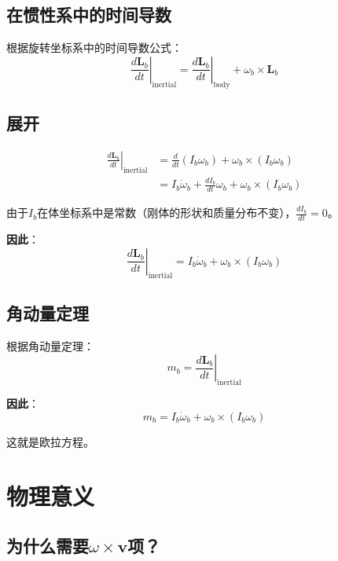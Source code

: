 \documentclass[12pt,a4paper]{article}
\begin{document}
\subsection{在惯性系中的时间导数}

根据旋转坐标系中的时间导数公式：
\begin{equation}
\left.\frac{d\bm{L}_b}{dt}\right|_{\text{inertial}} = \left.\frac{d\bm{L}_b}{dt}\right|_{\text{body}} + \omega_b \times \bm{L}_b
\end{equation}

\subsection{展开}

\begin{align}
\left.\frac{d\bm{L}_b}{dt}\right|_{\text{inertial}} &= \frac{d}{dt}(I_b \omega_b) + \omega_b \times (I_b \omega_b) \\
&= I_b \dot{\omega}_b + \frac{dI_b}{dt} \omega_b + \omega_b \times (I_b \omega_b)
\end{align}

由于$I_b$在体坐标系中是常数（刚体的形状和质量分布不变），$\frac{dI_b}{dt} = 0$。

\textbf{因此}：
\begin{equation}
\left.\frac{d\bm{L}_b}{dt}\right|_{\text{inertial}} = I_b \dot{\omega}_b + \omega_b \times (I_b \omega_b)
\end{equation}

\subsection{角动量定理}

根据角动量定理：
\begin{equation}
m_b = \left.\frac{d\bm{L}_b}{dt}\right|_{\text{inertial}}
\end{equation}

\textbf{因此}：
\begin{equation}
m_b = I_b \dot{\omega}_b + \omega_b \times (I_b \omega_b)
\end{equation}

这就是欧拉方程。

\section{物理意义}

\subsection{为什么需要$\omega \times \bm{v}$项？}
\end{document}
